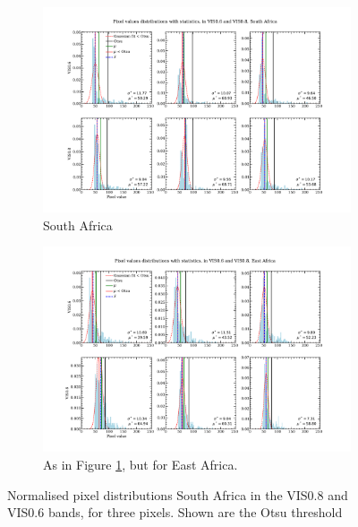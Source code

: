 \begin{figure}
  \vspace*{-1.0in}
  \centering
  \begin{subfigure}{\textwidth}
    \includegraphics[width=\textwidth]{figures/pixel_distributions_stats_capetown}
    \vspace*{-0.6in}
    \caption{South Africa}
    \label{fig:pix_d_south}
  \end{subfigure}
  \begin{subfigure}{\textwidth}
    \centering
    \includegraphics[width=\textwidth]{figures/pixel_distributions_stats_eastafrica}
    \vspace*{-0.6in}
    \caption{As in Figure \ref{fig:pix_d_south}, but for East Africa.}
    \label{fig:pix_d_east}
  \end{subfigure}
  \caption{Normalised pixel distributions South Africa in the VIS0.8
    and VIS0.6 bands, for three pixels. Shown are the Otsu threshold
}
\end{figure}
